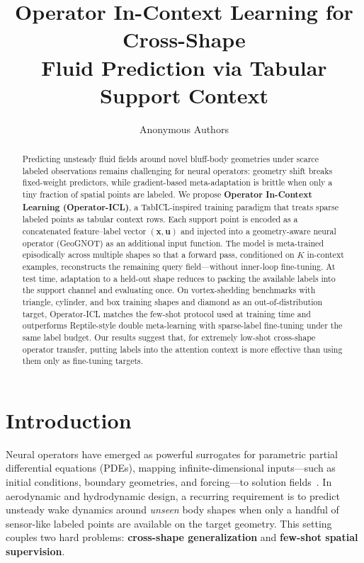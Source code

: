 \documentclass[11pt,a4paper]{article}
\title{Operator In-Context Learning for Cross-Shape\\
Fluid Prediction via Tabular Support Context}
\author{Anonymous Authors}
\date{}
\begin{document}
\maketitle

\begin{abstract}
Predicting unsteady fluid fields around novel bluff-body geometries under scarce labeled observations remains challenging for neural operators: geometry shift breaks fixed-weight predictors, while gradient-based meta-adaptation is brittle when only a tiny fraction of spatial points are labeled.
We propose \textbf{Operator In-Context Learning (Operator-ICL)}, a TabICL-inspired training paradigm that treats sparse labeled points as tabular context rows.
Each support point is encoded as a concatenated feature--label vector $(\mathbf{x}, \mathbf{u})$ and injected into a geometry-aware neural operator (GeoGNOT) as an additional input function.
The model is meta-trained episodically across multiple shapes so that a forward pass, conditioned on $K$ in-context examples, reconstructs the remaining query field---without inner-loop fine-tuning.
At test time, adaptation to a held-out shape reduces to packing the available labels into the support channel and evaluating once.
On vortex-shedding benchmarks with triangle, cylinder, and box training shapes and diamond as an out-of-distribution target, Operator-ICL matches the few-shot protocol used at training time and outperforms Reptile-style double meta-learning with sparse-label fine-tuning under the same label budget.
Our results suggest that, for extremely low-shot cross-shape operator transfer, putting labels into the attention context is more effective than using them only as fine-tuning targets.
\end{abstract}

\section{Introduction}
\label{sec:intro}

Neural operators have emerged as powerful surrogates for parametric partial differential equations (PDEs), mapping infinite-dimensional inputs---such as initial conditions, boundary geometries, and forcing---to solution fields~\cite{li2021fourier,lu2021deeponet,hao2023gnot}.
In aerodynamic and hydrodynamic design, a recurring requirement is to predict unsteady wake dynamics around \emph{unseen} body shapes when only a handful of sensor-like labeled points are available on the target geometry.
This setting couples two hard problems: \textbf{cross-shape generalization} and \textbf{few-shot spatial supervision}.
\end{document}

